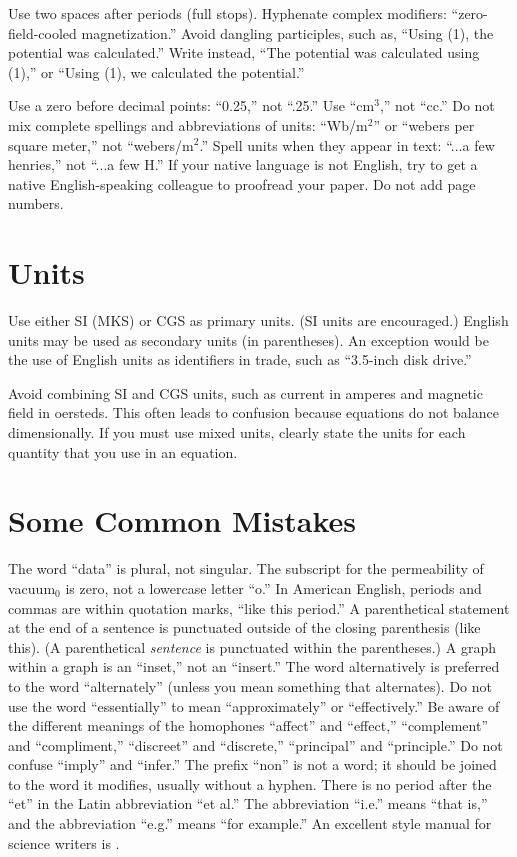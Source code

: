 \documentclass[conference,a4paper]{APSIPA2026}
\begin{document}
Use two spaces after periods (full stops).
Hyphenate complex modifiers: ``zero-field-cooled magnetization.''
Avoid dangling participles, such as, ``Using (1), the potential was calculated.''
Write instead, ``The potential was calculated using (1),'' or ``Using (1), we calculated the potential.''




Use a zero before decimal points: ``0.25,'' not ``.25.''
Use ``cm$^3$,'' not ``cc.''
Do not mix complete spellings and abbreviations of units: ``Wb/m$^2$'' or ``webers per square meter,'' not ``webers/m$^2$.''
Spell units when they appear in text: ``...a few henries,'' not ``...a few H.''
If your native language is not English, try to get a native English-speaking colleague to proofread your paper.
Do not add page numbers.

\section{Units}

Use either SI (MKS) or CGS as primary units. (SI units are encouraged.)
English units may be used as secondary units (in parentheses).
An exception would be the use of English units as identifiers in trade, such as ``3.5-inch disk drive.''

Avoid combining SI and CGS units, such as current in amperes and magnetic field in oersteds.
This often leads to confusion because equations do not balance dimensionally.
If you must use mixed units, clearly state the units for each quantity that you use in an equation.

\section{Some Common Mistakes}
The word ``data'' is plural, not singular.
The subscript for the permeability of vacuum$_0$ is zero, not a lowercase letter ``o.''
In American English, periods and commas are within quotation marks, ``like this period.''
A parenthetical statement at the end of a sentence is punctuated outside of the closing parenthesis (like this).
(A parenthetical \emph{sentence} is punctuated within the parentheses.)
A graph within a graph is an ``inset,'' not an ``insert.''
The word alternatively is preferred to the word ``alternately'' (unless you mean something that alternates).
Do not use the word ``essentially'' to mean ``approximately'' or ``effectively.''
Be aware of the different meanings of the homophones ``affect'' and ``effect,'' ``complement'' and ``compliment,'' ``discreet'' and ``discrete,'' ``principal'' and ``principle.''
Do not confuse ``imply'' and ``infer.''
The prefix ``non'' is not a word; it should be joined to the word it modifies, usually without a hyphen.
There is no period after the ``et'' in the Latin abbreviation ``et al.''
The abbreviation ``i.e.''  means ``that is,'' and the abbreviation ``e.g.''  means ``for example.''
An excellent style manual for science writers is \cite{young2002technical}.
\end{document}
